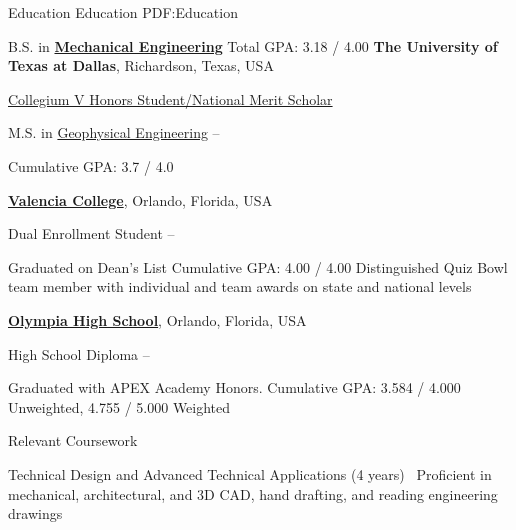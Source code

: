 \documentclass[letterpaper,MMMyyyy,nonstopmode]{simpleresumecv}
\begin{document}
\begin{Body}

\Section
{Education}
{Education}
{PDF:Education}


\Entry
B.S. in
\href{https://me.utdallas.edu}
{\textbf{Mechanical Engineering}}
\hfill
Total GPA: 3.18 / 4.00
\BulletItem
{\textbf{The University of Texas at Dallas}},
Richardson, Texas, USA
\hfill
\SmallGap
\begin{Detail}
\SubBulletItem
\href{https://honors.utdallas.edu/nmsp}
{Collegium V Honors Student/National Merit Scholar}

\end{Detail}

\iffalse
    	\Gap
    	\BulletItem
    	M.S. in
    	\href{http://www.example.com/my-department}
    	{Geophysical Engineering}
    	\hfill
    	 --
    	\begin{Detail}
    	\SubBulletItem
    	Cumulative GPA: 3.7 / 4.0
    	\end{Detail}
    \Entry
    \href{https://valenciacollege.edu/}
    {\textbf{Valencia College}},
    Orlando, Florida, USA
    
    \BulletItem
    Dual Enrollment Student
    \hfill
     --
    \begin{Detail}
    \SubBulletItem
    Graduated on Dean's List %
    \SubBulletItem
    Cumulative GPA: 4.00 / 4.00
    \SubBulletItem
    Distinguished Quiz Bowl team member with individual and team awards on state and national levels
    
    \end{Detail}
    \Entry
    \href{https://olympiahs.ocps.net}
    {\textbf{Olympia High School}},
    Orlando, Florida, USA
    
    \BulletItem
    High School Diploma
    \hfill
     --
    \begin{Detail}
    \SubBulletItem
    Graduated with APEX Academy Honors.
    \SubBulletItem
    Cumulative GPA: 3.584 / 4.000 Unweighted, 4.755 / 5.000 Weighted
    \end{Detail}
    \BulletItem
    Relevant Coursework
    \begin{Detail}
    \BulletItem
    Technical Design and Advanced Technical Applications (4 years)\
    \SubBulletItem
    Proficient in mechanical, architectural, and 3D CAD, hand drafting, and reading engineering drawings
    

\end{Detail}
\end{Body}
\end{document}
